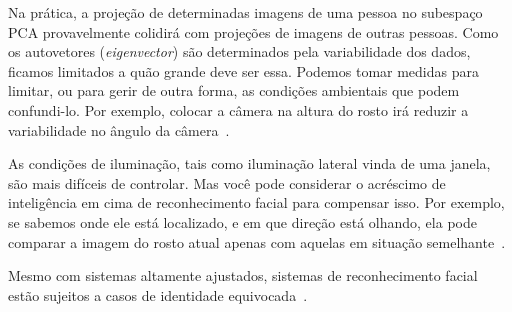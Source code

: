 Na prática, a projeção de determinadas imagens de uma pessoa no subespaço PCA provavelmente colidirá com projeções de imagens de outras pessoas. Como os autovetores (\textit{eigenvector}) são determinados pela variabilidade dos dados, ficamos limitados a quão grande deve ser essa. Podemos tomar medidas para limitar, ou para gerir de outra forma, as condições ambientais que podem confundi-lo. Por exemplo, colocar a câmera na altura do rosto irá reduzir a variabilidade no ângulo da câmera~\cite{hewitt}.

As condições de iluminação, tais como iluminação lateral vinda de uma janela, são mais difíceis de controlar. Mas você pode considerar o acréscimo de inteligência em cima de reconhecimento facial para compensar isso. Por exemplo, se sabemos onde ele está localizado, e em que direção está olhando, ela pode comparar a imagem do rosto atual apenas com aquelas em situação semelhante~\cite{hewitt}.

Mesmo com sistemas altamente ajustados, sistemas de reconhecimento facial estão sujeitos a casos de identidade equivocada~\cite{hewitt}.

